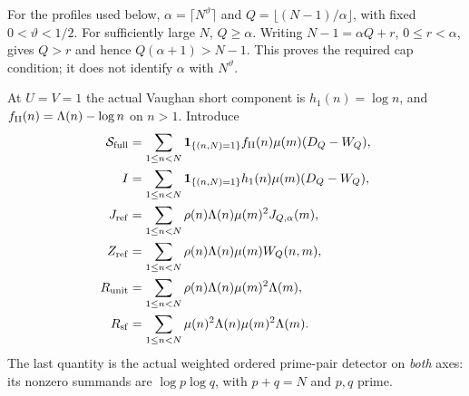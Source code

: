\documentclass[11pt,a4paper]{article}
\theoremstyle{definition}
\theoremstyle{remark}
\begin{document}
For the profiles used below,
$\alpha=\lceil N^\vartheta\rceil$ and
$Q=\lfloor(N-1)/\alpha\rfloor$, with fixed $0<\vartheta<1/2$.
For sufficiently large $N$, $Q\geq\alpha$.  Writing
$N-1=\alpha Q+r$, $0\leq r<\alpha$, gives $Q>r$ and hence
$Q(\alpha+1)>N-1$.  This proves the required cap condition; it does
not identify $\alpha$ with $N^\vartheta$.

At $U=V=1$ the actual Vaughan short component is $h_1(n)=\log n$,
and $f_{\rm II}(n)=\Lambda(n)-\log n$ on $n>1$.  Introduce
\begin{align*}
 \mathcal S_{\rm full}
 &=\sum_{1\leq n<N}\mathbf1_{\{(n,N)=1\}}
                  f_{\rm II}(n)\mu(m)(D_Q-W_Q),\\
 I&=\sum_{1\leq n<N}\mathbf1_{\{(n,N)=1\}}
                  h_1(n)\mu(m)(D_Q-W_Q),\\
 J_{\rm ref}&=\sum_{1\leq n<N}\rho(n)\Lambda(n)\mu(m)^2J_{Q,\alpha}(m),\\
 Z_{\rm ref}&=\sum_{1\leq n<N}\rho(n)\Lambda(n)\mu(m)W_Q(n,m),\\
 R_{\rm unit}&=\sum_{1\leq n<N}\rho(n)\Lambda(n)\mu(m)^2\Lambda(m),\\
 R_{\rm sf}&=\sum_{1\leq n<N}\mu(n)^2\Lambda(n)\mu(m)^2\Lambda(m).
\end{align*}
The last quantity is the actual weighted ordered prime-pair detector
on \emph{both} axes: its nonzero summands are
$\log p\log q$, with $p+q=N$ and $p,q$ prime.
\end{document}
